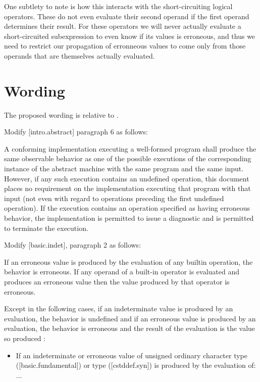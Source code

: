 One subtlety to note is how this interacts with the short-circuiting logical operators.  These do not even evaluate their second operand if the first operand determines their result.  For these operators we will never actually evaluate a short-circuited subexpression to even know if its values is erroneous, and thus we need to restrict our propagation of erronneous values to come only from those operands that are themselves actually evaluated.



\section{Wording}

The proposed wording is relative to \cite{N5014}. 

Modify [intro.abstract] paragraph 6 as follows:

\begin{adjustwidth}{0.5cm}{0.5cm}
A conforming implementation executing a well-formed program shall produce the same observable behavior as one of the possible executions of the corresponding instance of the abstract machine with the same program and the same input. However, if any such execution contains an undefined operation, this document places no requirement on the implementation executing that program with that input (not even with regard to operations preceding the first undefined operation). If the execution contains an operation specified as having erroneous behavior, the implementation is permitted to issue a diagnostic and is permitted to terminate the execution.
\end{adjustwidth}


Modify [basic.indet], paragraph 2 as follows:

\begin{adjustwidth}{0.5cm}{0.5cm}
\begin{addedblock}
If an erroneous value is produced by the evaluation of any builtin operation, the behavior is erroneous.
If any operand of a built-in operator is evaluated and produces an erroneous value then the value
produced by that operator is erroneous.
\end{addedblock}

Except in the following cases, if an indeterminate value is produced by an evaluation,
the behavior is undefined  and if an erroneous value is produced by an evaluation, the behavior is erroneous and
the result of the evaluation is the value so produced 
:
\begin{itemize}
\item If an indeterminate or erroneous value of unsigned ordinary character type ([basic.\allowbreak{}fundamental]) or  type ([cstddef.syn]) is produced by the evaluation of:  \\ ...
\end{itemize}
\end{adjustwidth}


